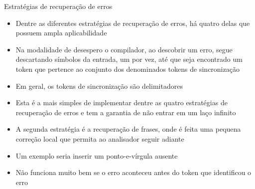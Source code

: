 \begin{frame}[fragile]{Estratégias de recuperação de erros}

    \begin{itemize}
        \item Dentre as diferentes estratégias de recuperação de erros, há quatro delas que possuem ampla aplicabilidade
        \pause

        \item Na modalidade de desespero o compilador, ao descobrir um erro, segue descartando símbolos da entrada, um por vez, até que seja encontrado um token
            que pertence ao conjunto dos denominados tokens de sincronização
        \pause

        \item Em geral, os tokens de sincronização são delimitadores
        \pause

        \item Esta é a mais simples de implementar dentre as quatro estratégias de recuperação de erros e tem a garantia de não entrar em um laço infinito
        \pause

        \item A segunda estratégia é a recuperação de frases, onde é feita uma pequena correção local que permita ao analisador seguir adiante
        \pause

        \item Um exemplo seria inserir um ponto-e-vírgula ausente 
        \pause

        \item Não funciona muito bem se o erro aconteceu antes do token que identificou o erro
    \end{itemize}

\end{frame}

